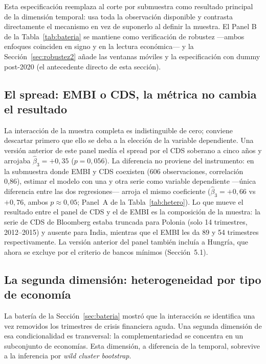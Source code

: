 Esta especificación reemplaza al corte por submuestra como resultado principal de la dimensión temporal: usa toda la observación disponible y contrasta directamente el mecanismo en vez de suponerlo al definir la muestra. El Panel B de la Tabla~\ref{tab:bateria} se mantiene como verificación de robustez —ambos enfoques coinciden en signo y en la lectura económica— y la Sección~\ref{sec:robustez2} añade las ventanas móviles y la especificación con dummy post-2020 (el antecedente directo de esta sección).

\subsection{El spread: EMBI o CDS, la métrica no cambia el resultado}

La interacción de la muestra completa es indistinguible de cero; conviene descartar primero que ello se deba a la elección de la variable dependiente. Una versión anterior de este panel medía el spread por el CDS soberano a cinco años y arrojaba $\hat\beta_3=+0{,}35$ ($p=0{,}056$). La diferencia no proviene del instrumento: en la submuestra donde EMBI y CDS coexisten (606 observaciones, correlación 0,86), estimar el modelo con una y otra serie como variable dependiente —única diferencia entre las dos regresiones— arroja el mismo coeficiente ($\hat\beta_3=+0{,}66$ vs $+0{,}76$, ambos $p\approx0{,}05$; Panel~A de la Tabla~\ref{tab:hetero}). Lo que mueve el resultado entre el panel de CDS y el de EMBI es la composición de la muestra: la serie de CDS de Bloomberg estaba truncada para Polonia (solo 14 trimestres, 2012--2015) y ausente para India, mientras que el EMBI les da 89 y 54 trimestres respectivamente. La versión anterior del panel también incluía a Hungría, que ahora se excluye por el criterio de bancos mínimos (Sección~5.1).

\subsection{La segunda dimensión: heterogeneidad por tipo de economía}
\label{sec:hetero}

La batería de la Sección~\ref{sec:bateria} mostró que la interacción se identifica una vez removidos los trimestres de crisis financiera aguda. Una segunda dimensión de esa condicionalidad es transversal: la complementariedad se concentra en un subconjunto de economías. Esta dimensión, a diferencia de la temporal, sobrevive a la inferencia por \textit{wild cluster bootstrap}.

